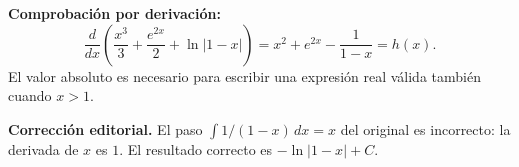 \documentclass[11pt]{article}
\begin{document}
\textbf{Comprobación por derivación:}
\[
\frac{d}{dx}\left(\frac{x^3}{3}+\frac{e^{2x}}2+\ln|1-x|\right)
=x^2+e^{2x}-\frac1{1-x}=h(x).
\]
El valor absoluto es necesario para escribir una expresión real válida también cuando $x>1$.

\textbf{Corrección editorial.} El paso $\int1/(1-x)\,dx=x$ del original es incorrecto: la derivada de $x$ es $1$. El resultado correcto es $-\ln|1-x|+C$.
\end{document}
